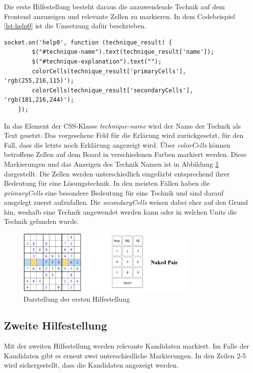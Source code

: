 Die erste Hilfestellung besteht daraus die anzuwendende Technik auf dem Frontend anzuzeigen und relevante Zellen zu markieren.  In dem Codebeispiel \ref{lst:help0} ist die Umsetzung dafür beschrieben.

\begin{lstlisting}[caption={Erste Hilfestellung}, label={lst:help0}]
	socket.on('help0', function (technique_result) {
		$("#technique-name").text(technique_result['name']);
		$("#technique-explanation").text("");
		colorCells(technique_result['primaryCells'], 'rgb(255,216,115)');
		colorCells(technique_result['secondaryCells'], 'rgb(181,216,244)');
	});
\end{lstlisting}

In das Element der CSS-Klasse \textit{technique-name} wird der Name der Technik als Text gesetzt. Das vorgesehene Feld für die Erlärung wird zurückgesetzt, für den Fall, dass die letzte noch Erklärung angezeigt wird. Über \textit{colorCells} können betroffene Zellen auf dem Board in verschiedenen Farben markiert werden. Diese Markierungen und das Anzeigen des Technik Namen ist in Abbildung \ref{fig:Help1} dargestellt. Die Zellen werden unterschiedlich eingefärbt entsprechend ihrer Bedeutung für eine Lösungstechnik. In den meisten Fällen haben die \textit{primaryCells} eine besondere Bedeutung für eine Technik und sind darauf ausgelegt zuerst aufzufallen. Die \textit{secondaryCells} weisen dabei eher auf den Grund hin, weshalb eine Technik angewendet werden kann oder in welchen Units die Technik gefunden wurde.

\begin{figure}[htbp]
	\centering
	\includegraphics[width=0.8\textwidth]{images/Help1.png}
	\caption{Darstellung der ersten Hilfestellung}
	\label{fig:Help1}
\end{figure}

\subsection{Zweite Hilfestellung}
Mit der zweiten Hilfestellung werden relevante Kandidaten markiert. Im Falle der Kandidaten gibt es erneut zwei unterschiedliche Markierungen. In den Zeilen 2-5 wird sichergestellt, dass die Kandidaten angezeigt werden. 

